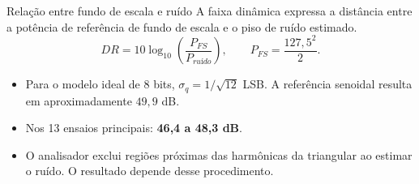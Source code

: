 \begin{block}{Relação entre fundo de escala e ruído}
A faixa dinâmica expressa a distância entre a potência de referência de fundo de escala e o piso de ruído estimado.
\[
DR=10\log_{10}\left(\frac{P_{FS}}{P_{ruído}}\right),
\qquad P_{FS}=\frac{127{,}5^2}{2}.
\]
\end{block}
\begin{itemize}
\item Para o modelo ideal de 8 bits, $\sigma_q=1/\sqrt{12}$ LSB. A referência senoidal resulta em aproximadamente $49{,}9$ dB.
\item Nos 13 ensaios principais: \textbf{46,4 a 48,3 dB}.
\item O analisador exclui regiões próximas das harmônicas da triangular ao estimar o ruído. O resultado depende desse procedimento.
\end{itemize}
